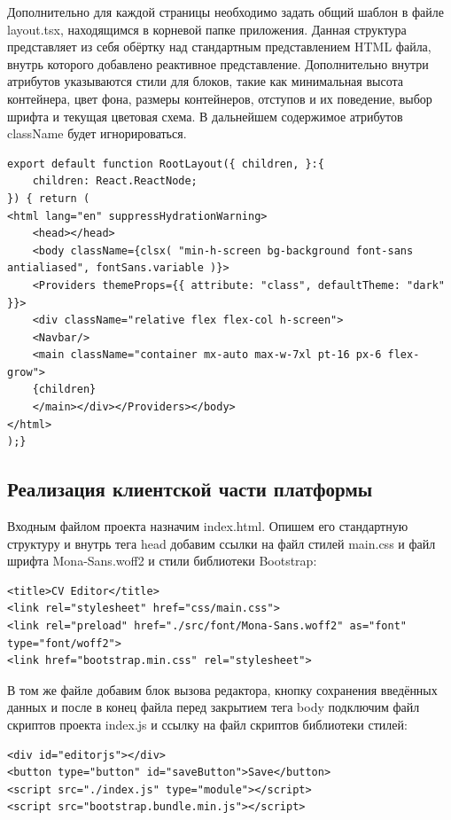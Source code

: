 \documentclass[master, och, diploma]{SCWorks}
\begin{document}
Дополнительно для каждой страницы необходимо задать общий шаблон в файле layout.tsx, находящимся в корневой папке приложения. Данная структура представляет из себя обёртку над стандартным представлением HTML файла, внутрь которого добавлено реактивное представление. Дополнительно внутри атрибутов указываются стили для блоков, такие как минимальная высота контейнера, цвет фона, размеры контейнеров, отступов и их поведение, выбор шрифта и текущая цветовая схема. В дальнейшем содержимое атрибутов className будет  игнорироваться. 
\begin{verbatim}
export default function RootLayout({ children, }:{
	children: React.ReactNode;
}) { return (
<html lang="en" suppressHydrationWarning>  
    <head></head>
    <body className={clsx( "min-h-screen bg-background font-sans antialiased", fontSans.variable )}>
    <Providers themeProps={{ attribute: "class", defaultTheme: "dark" }}>
    <div className="relative flex flex-col h-screen">
    <Navbar/>
    <main className="container mx-auto max-w-7xl pt-16 px-6 flex-grow">
    {children}
    </main></div></Providers></body>
</html>
);}
\end{verbatim}



\subsection{Реализация клиентской части платформы}
Входным файлом проекта назначим index.html. Опишем его стандартную структуру и внутрь тега head добавим ссылки на файл стилей main.css и файл шрифта Mona-Sans.woff2 и стили библиотеки Bootstrap:
\begin{verbatim}
<title>CV Editor</title>
<link rel="stylesheet" href="css/main.css">
<link rel="preload" href="./src/font/Mona-Sans.woff2" as="font" type="font/woff2">
<link href="bootstrap.min.css" rel="stylesheet">
\end{verbatim}

В том же файле добавим блок вызова редактора, кнопку сохранения введённых данных и после в конец файла перед закрытием тега body подключим файл скриптов проекта index.js и ссылку на файл скриптов библиотеки стилей:
\begin{verbatim}
<div id="editorjs"></div>
<button type="button" id="saveButton">Save</button>
<script src="./index.js" type="module"></script>
<script src="bootstrap.bundle.min.js"></script>
\end{verbatim}
\end{document}
